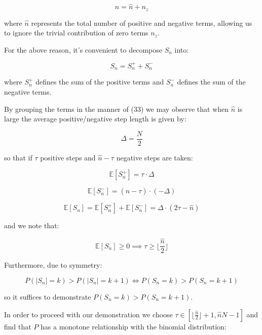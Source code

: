 \documentclass{article}
\begin{document}
\begin{equation}
n = \hat{n} + n_z
\end{equation}

where $\hat{n}$ represents the total number of positive and negative terms, allowing us to ignore the trivial
contribution of zero terms $n_z$.

For the above reason, it's convenient to decompose $S_n$ into:

\begin{equation}
S_n = S_n^+ + S_n^{-}
\end{equation}

where $S_n^+$ defines the sum of the positive terms and $S_n^{-}$ defines the sum
of the negative terms.

By grouping the terms in the manner of (33) we may observe that when
$\hat{n}$ is large the average positive/negative step length is given by:

\begin{equation}
\Delta = \frac{N}{2}
\end{equation}

so that if $\tau$ positive steps and $\hat{n}-\tau$ negative steps are taken:

\begin{equation}
\mathbb{E}[S_n^+] = \tau \cdot \Delta
\end{equation}

\begin{equation}
\mathbb{E}[S_n^-] = (\hat{n}-\tau) \cdot (-\Delta)
\end{equation}

\begin{equation}
\mathbb{E}[S_n] =  \mathbb{E}[S_n^+] + \mathbb{E}[S_n^-] = \Delta \cdot (2\tau-\hat{n})
\end{equation}

and we note that:

\begin{equation}
\mathbb{E}[S_n] \geq 0 \implies \tau \geq \lfloor \frac{\hat{n}}{2} \rfloor
\end{equation}

Furthermore, due to symmetry:

\begin{equation}
P(\lvert S_n \rvert =k) > P(\lvert S_n \rvert =k+1) \iff P(S_n =k) > P(S_n =k+1)
\end{equation}

so it suffices to demonstrate $P(S_n =k) > P(S_n =k+1)$.

In order to proceed with our demonstration we choose $\tau \in [\lfloor \frac{\hat{n}}{2} \rfloor + 1,\hat{n}N-1]$ and find
that $P$ has a monotone relationship with the binomial distribution:
\end{document}
